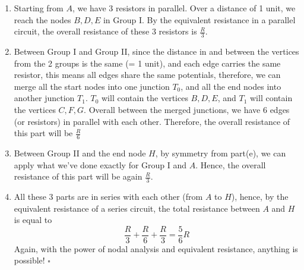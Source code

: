\begin{enumerate}
{    \begin{enumerate}
        \item Starting from $A$, we have 3 resistors in parallel. Over a distance of 1 unit, we reach the nodes $B, D, E$ in Group I. By the equivalent resistance in a parallel circuit, the overall resistance of these 3 resistors is $\frac{R}{3}$.
        \item Between Group I and Group II, since the distance in and between the vertices from the 2 groups is the same (= 1 unit), and each edge carries the same resistor, this means all edges share the same potentials, therefore, we can merge all the start nodes into one junction $T_0$, and all the end nodes into another junction $T_1$. $T_0$ will contain the vertices $B, D, E$, and $T_1$ will contain the vertices $C, F, G$. Overall between the merged junctions, we have 6 edges (or resistors) in parallel with each other. Therefore, the overall resistance of this part will be $\frac{R}{6}$
        \item Between Group II and the end node $H$, by symmetry from part(e), we can apply what we've done exactly for Group I and $A$. Hence, the overall resistance of this part will be again $\frac{R}{3}$.
        \item All these 3 parts are in series with each other (from $A$ to $H$), hence, by the equivalent resistance of a series circuit, the total resistance between $A$ and $H$ is equal to 
        $$ \frac{R}{3} + \frac{R}{6} + \frac{R}{3} = \frac{5}{6}R$$
        Again, with the power of nodal analysis and equivalent resistance, anything is possible! $\square$
    \end{enumerate}
    }
\end{enumerate}